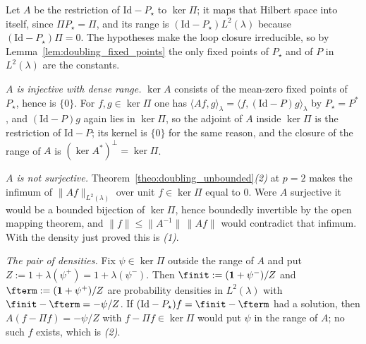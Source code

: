 Let $A$ be the restriction of $\mathrm{Id}-P_\star$ to $\ker\Pi$; it maps that Hilbert space
into itself, since $\Pi P_\star=\Pi$, and its range is
$(\mathrm{Id}-P_\star)L^2(\lambda)$ because $(\mathrm{Id}-P_\star)\Pi=0$. The hypotheses make
the loop closure irreducible, so by Lemma~\ref{lem:doubling_fixed_points} the only fixed points
of $P_\star$ and of $P$ in $L^2(\lambda)$ are the constants.

\emph{$A$ is injective with dense range.} $\ker A$ consists of the mean-zero fixed points of
$P_\star$, hence is $\{0\}$. For $f,g\in\ker\Pi$ one has
$\langle Af,g\rangle_\lambda=\langle f,(\mathrm{Id}-P)g\rangle_\lambda$ by $P_\star=P^*$, and
$(\mathrm{Id}-P)g$ again lies in $\ker\Pi$, so the adjoint of $A$ inside $\ker\Pi$ is the
restriction of $\mathrm{Id}-P$; its kernel is $\{0\}$ for the same reason, and the closure of
the range of $A$ is $(\ker A^*)^{\perp}=\ker\Pi$.

\emph{$A$ is not surjective.} Theorem~\ref{theo:doubling_unbounded}\emph{(2)} at $p=2$ makes
the infimum of $\|Af\|_{L^2(\lambda)}$ over unit $f\in\ker\Pi$ equal to $0$. Were $A$
surjective it would be a bounded bijection of $\ker\Pi$, hence boundedly invertible by the open
mapping theorem, and $\|f\|\leq\|A^{-1}\|\,\|Af\|$ would contradict that infimum. With the
density just proved this is \emph{(1)}.

\emph{The pair of densities.} Fix $\psi\in\ker\Pi$ outside the range of $A$ and put
$Z:=1+\lambda(\psi^{+})=1+\lambda(\psi^{-})$. Then $\finit:=(\mathbf 1+\psi^{-})/Z$ and
$\fterm:=(\mathbf 1+\psi^{+})/Z$ are probability densities in $L^2(\lambda)$ with
$\finit-\fterm=-\psi/Z$. If $(\mathrm{Id}-P_\star)f=\finit-\fterm$ had a solution, then
$A(f-\Pi f)=-\psi/Z$ with $f-\Pi f\in\ker\Pi$ would put $\psi$ in the range of $A$; no such $f$
exists, which is \emph{(2)}.
